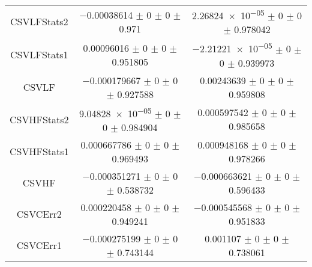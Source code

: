 \begin{table}
\begin{tabular}{ccc}
CSVLFStats2 	& \num{-0.00038614} $\pm$ \num{0} $\pm$ \num{0} $\pm$ \num{0.971} 	& \num{2.26824e-05} $\pm$ \num{0} $\pm$ \num{0} $\pm$ \num{0.978042}\\
CSVLFStats1 	& \num{0.00096016} $\pm$ \num{0} $\pm$ \num{0} $\pm$ \num{0.951805} 	& \num{-2.21221e-05} $\pm$ \num{0} $\pm$ \num{0} $\pm$ \num{0.939973}\\
CSVLF 	& \num{-0.000179667} $\pm$ \num{0} $\pm$ \num{0} $\pm$ \num{0.927588} 	& \num{0.00243639} $\pm$ \num{0} $\pm$ \num{0} $\pm$ \num{0.959808}\\
CSVHFStats2 	& \num{9.04828e-05} $\pm$ \num{0} $\pm$ \num{0} $\pm$ \num{0.984904} 	& \num{0.000597542} $\pm$ \num{0} $\pm$ \num{0} $\pm$ \num{0.985658}\\
CSVHFStats1 	& \num{0.000667786} $\pm$ \num{0} $\pm$ \num{0} $\pm$ \num{0.969493} 	& \num{0.000948168} $\pm$ \num{0} $\pm$ \num{0} $\pm$ \num{0.978266}\\
CSVHF 	& \num{-0.000351271} $\pm$ \num{0} $\pm$ \num{0} $\pm$ \num{0.538732} 	& \num{-0.000663621} $\pm$ \num{0} $\pm$ \num{0} $\pm$ \num{0.596433}\\
CSVCErr2 	& \num{0.000220458} $\pm$ \num{0} $\pm$ \num{0} $\pm$ \num{0.949241} 	& \num{-0.000545568} $\pm$ \num{0} $\pm$ \num{0} $\pm$ \num{0.951833}\\
CSVCErr1 	& \num{-0.000275199} $\pm$ \num{0} $\pm$ \num{0} $\pm$ \num{0.743144} 	& \num{0.001107} $\pm$ \num{0} $\pm$ \num{0} $\pm$ \num{0.738061}\\
\bottomrule
\end{tabular}
\end{table}